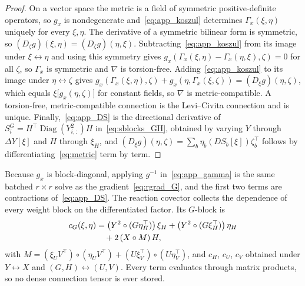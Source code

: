 \documentclass[letterpaper, 10 pt, conference]{ieeeconf}
\newcommand{\diag}{\operatorname{Diag}}
\newcommand{\Had}{\circ}
\theoremstyle{plain}
\theoremstyle{definition}
\theoremstyle{remark}
\begin{document}
\begin{proof}
On a vector space the metric is a field of symmetric positive-definite operators, so $g_x$ is nondegenerate and~\eqref{eq:app_koszul} determines $\Gamma_x(\xi,\eta)$ uniquely for every $\xi,\eta$. The derivative of a symmetric bilinear form is symmetric, so $(D_\zeta g)(\xi,\eta)=(D_\zeta g)(\eta,\xi)$. Subtracting~\eqref{eq:app_koszul} from its image under $\xi\!\leftrightarrow\!\eta$ and using this symmetry gives $g_x(\Gamma_x(\xi,\eta)-\Gamma_x(\eta,\xi),\zeta)=0$ for all $\zeta$, so $\Gamma_x$ is symmetric and $\nabla$ is torsion-free. Adding~\eqref{eq:app_koszul} to its image under $\eta\!\leftrightarrow\!\zeta$ gives $g_x(\Gamma_x(\xi,\eta),\zeta)+g_x(\eta,\Gamma_x(\xi,\zeta))=(D_\xi g)(\eta,\zeta)$, which equals $\xi\big[g_x(\eta,\zeta)\big]$ for constant fields, so $\nabla$ is metric-compatible. A torsion-free, metric-compatible connection is the Levi--Civita connection and is unique. Finally,~\eqref{eq:app_DS} is the directional derivative of $S_i^G=H^\top\diag(Y_{i,:}^2)H$ in~\eqref{eq:sblocks_GH}, obtained by varying $Y$ through $\Delta Y[\xi]$ and $H$ through $\xi_H$, and $(D_\xi g)(\eta,\zeta)=\sum_b\eta_b(DS_b[\xi])\zeta_b^\top$ follows by differentiating~\eqref{eq:metric} term by term.
\end{proof}

Because $g_x$ is block-diagonal, applying $g^{-1}$ in~\eqref{eq:app_gamma} is the same batched $r\times r$ solve as the gradient~\eqref{eq:rgrad_G}, and the first two terms are contractions of~\eqref{eq:app_DS}. The reaction covector collects the dependence of every weight block on the differentiated factor. Its $G$-block is
\begin{align}
  c_G(\xi,\eta) &= \big(Y^2\Had(G\eta_H^\top)\big)\,\xi_H + \big(Y^2\Had(G\xi_H^\top)\big)\,\eta_H \notag\\
  &\quad + 2\,(X\Had M)\,H,
  \label{eq:app_c}
\end{align}
with $M = (\xi_U V^\top)\Had(\eta_U V^\top) + (U\xi_V^\top)\Had(U\eta_V^\top)$, and $c_H$, $c_U$, $c_V$ obtained under $Y\!\leftrightarrow\!X$ and $(G,H)\!\leftrightarrow\!(U,V)$. Every term evaluates through matrix products, so no dense connection tensor is ever stored.
\end{document}
